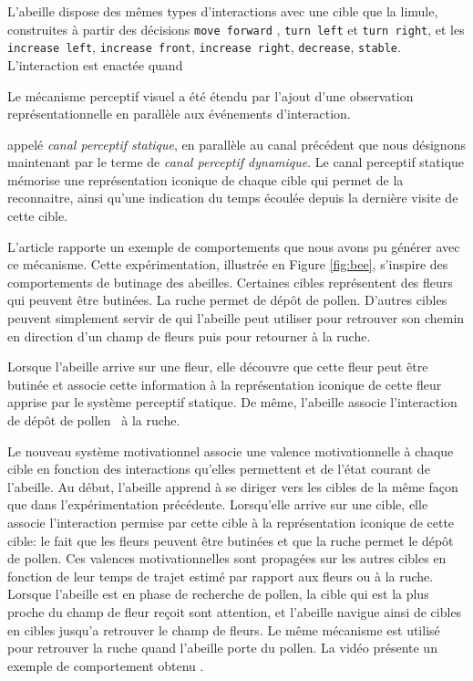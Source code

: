 L'abeille dispose des mêmes types d'interactions avec une cible que la limule, construites à partir des décisions \texttt{move forward} , \texttt{turn left} et \texttt{turn right}, et les  \texttt{increase left}, \texttt{increase front}, \texttt{increase right}, \texttt{decrease}, \texttt{stable}.  
L'interaction  est enactée quand 

Le mécanisme perceptif visuel a été étendu par l'ajout d'une observation représentationnelle en parallèle aux événements d'interaction. 

appelé \emph{canal perceptif statique}, en parallèle au canal précédent que nous désignons maintenant par le terme de \emph{canal perceptif dynamique}.
Le canal perceptif statique mémorise une représentation iconique de chaque cible qui permet de la reconnaitre, ainsi qu'une indication du temps écoulée depuis la dernière visite de cette cible. 

L'article  \cite{georgeon_early-stage_2011} rapporte un exemple de comportements que nous avons pu générer avec ce mécanisme.
Cette expérimentation, illustrée en Figure \ref{fig:bee}, s'inspire des comportements de butinage des abeilles. 
Certaines cibles représentent des fleurs qui peuvent être butinées. 
La ruche permet de dépôt de pollen.
D'autres cibles peuvent simplement servir de  qui l'abeille peut utiliser pour retrouver son chemin en direction d'un champ de fleurs puis pour retourner à la ruche.   

Lorsque l'abeille arrive sur une fleur, elle découvre que cette fleur peut être butinée et associe cette information à la représentation iconique de cette fleur apprise par le système perceptif statique. 
De même, l'abeille associe l'interaction de \og dépôt de pollen \fg\ à la ruche. 

Le nouveau système motivationnel associe une valence motivationnelle à chaque cible en fonction des interactions qu'elles permettent et de l'état courant de l'abeille. 
Au début, l'abeille apprend à se diriger vers les cibles de la même façon que dans l'expérimentation précédente. 
Lorsqu'elle arrive sur une cible, elle associe l'interaction permise par cette cible à la représentation iconique de cette cible: le fait que les fleurs peuvent être butinées et que la ruche permet le dépôt de pollen. 
Ces valences motivationnelles sont propagées sur les autres cibles en fonction de leur temps de trajet estimé par rapport aux fleurs ou à la ruche. 
Lorsque l'abeille est en phase de recherche de pollen, la cible qui est la plus proche du champ de fleur reçoit sont attention, et l'abeille navigue ainsi de cibles en cibles jusqu'a retrouver le champ de fleurs. 
Le même mécanisme est utilisé pour retrouver la ruche quand l'abeille porte du pollen. 
La vidéo présente un exemple de comportement obtenu \cite{georgeon_bee_2011}. 

